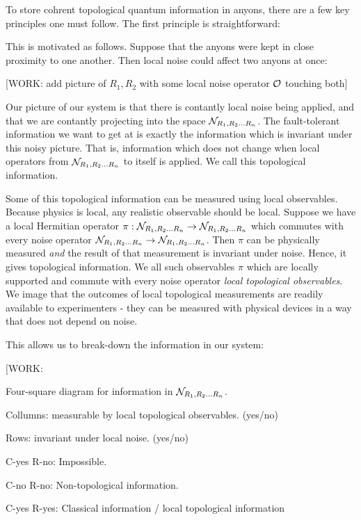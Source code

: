 To store cohrent topological quantum information in anyons, there are a few key principles one must follow. The first principle is straightforward:

\begin{center}
\end{center}

This is motivated as follows. Suppose that the anyons were kept in close proximity to one another. Then local noise could affect two anyons at once:

[WORK: add picture of $R_1,R_2$ with some local noise operator $\mathcal{O}$ touching both]

Our picture of our system is that there is contantly local noise being applied, and that we are contantly projecting into the space $\mathcal{N}_{R_1,R_2... R_n}$. The fault-tolerant information we want to get at is exactly the information which is invariant under this noisy picture. That is, information which does not change when local operators from $\mathcal{N}_{R_1,R_2... R_n}$ to itself is applied. We call this topological information.

Some of this topological information can be measured using local observables. Because physics is local, any realistic observable should be local. Suppose we have a local Hermitian operator $\pi: \mathcal{N}_{R_1,R_2... R_n}\to \mathcal{N}_{R_1,R_2... R_n}$ which commutes with every noise operator $\mathcal{N}_{R_1,R_2... R_n}\to \mathcal{N}_{R_1,R_2... R_n}$. Then $\pi$ can be physically measured \textit{and} the result of that measurement is invariant under noise. Hence, it gives topological information. We all such observables $\pi$ which are locally supported and commute with every noise operator \textit{local topological observables}. We image that the outcomes of local topological measurements are readily available to experimenters - they can be measured with physical devices in a way that does not depend on noise.

This allows us to break-down the information in our system:

[WORK:

Four-square diagram for information in $\mathcal{N}_{R_1,R_2... R_n}$.

Collumns: measurable by local topological observables. (yes/no)

Rows: invariant under local noise. (yes/no)

C-yes R-no: Impossible.

C-no R-no: Non-topological information.

C-yes R-yes: Classical information / local topological information


